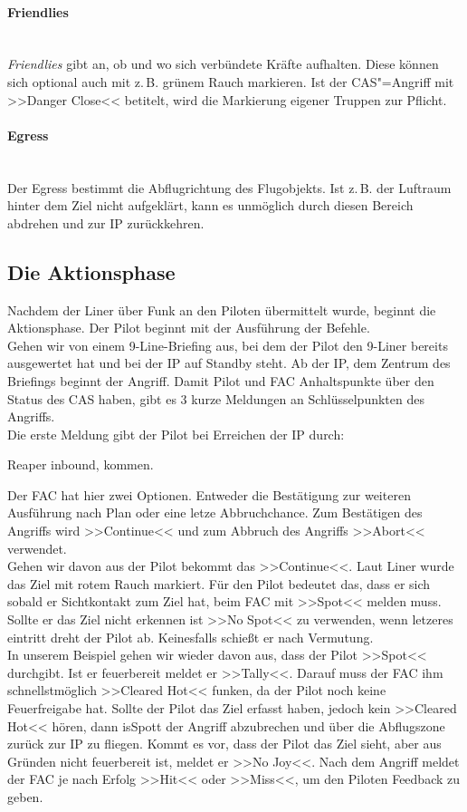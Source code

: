 \paragraph*{Friendlies}\hfil\\
\textit{Friendlies} gibt an, ob und wo sich verbündete Kräfte aufhalten. Diese können sich optional
auch mit z.\,B. grünem Rauch markieren. Ist der CAS"=Angriff mit >>Danger Close<< betitelt,
wird die Markierung eigener Truppen zur Pflicht.
\paragraph*{Egress}\hfil\\
Der Egress bestimmt die Abflugrichtung des Flugobjekts. Ist z.\,B. der Luftraum hinter dem
Ziel nicht aufgeklärt, kann es unmöglich durch diesen Bereich abdrehen und zur IP
zurückkehren.

\subsection{Die Aktionsphase}
Nachdem der Liner über Funk an den Piloten übermittelt wurde, beginnt die Aktionsphase.
Der Pilot beginnt mit der Ausführung der Befehle.\\
Gehen wir von einem 9-Line-Briefing aus, bei dem der Pilot den 9-Liner bereits
ausgewertet hat und bei der IP auf Standby steht. Ab der IP, dem Zentrum des Briefings
beginnt der Angriff. Damit Pilot und FAC Anhaltspunkte über den Status des CAS haben,
gibt es 3 kurze Meldungen an Schlüsselpunkten des Angriffs.\\
Die erste Meldung gibt der Pilot bei Erreichen der IP durch:
\begin{hint}
Reaper inbound, kommen.
\end{hint}
Der FAC hat hier zwei Optionen. Entweder die Bestätigung zur weiteren Ausführung nach
Plan oder eine letze Abbruchchance. Zum Bestätigen des Angriffs wird >>Continue<< und
zum Abbruch des Angriffs >>Abort<< verwendet.\\
Gehen wir davon aus der Pilot bekommt das >>Continue<<. Laut Liner wurde das Ziel mit
rotem Rauch markiert. Für den Pilot bedeutet das, dass er sich sobald er Sichtkontakt zum
Ziel hat, beim FAC mit >>Spot<< melden muss. Sollte er das Ziel nicht erkennen ist >>No Spot<<
zu verwenden, wenn letzeres eintritt dreht der Pilot ab. Keinesfalls schießt er nach
Vermutung.\\
In unserem Beispiel gehen wir wieder davon aus, dass der Pilot >>Spot<< durchgibt. Ist er
feuerbereit meldet er >>Tally<<. Darauf muss der FAC ihm schnellstmöglich >>Cleared Hot<<
funken, da der Pilot noch keine Feuerfreigabe hat. Sollte der Pilot das Ziel erfasst haben,
jedoch kein >>Cleared Hot<< hören, dann isSpott der Angriff abzubrechen und über die
Abflugszone zurück zur IP zu fliegen. Kommt es vor, dass der Pilot das Ziel sieht, aber aus
Gründen nicht feuerbereit ist, meldet er >>No Joy<<. Nach dem Angriff meldet der FAC je
nach Erfolg >>Hit<< oder >>Miss<<, um den Piloten Feedback zu geben.

